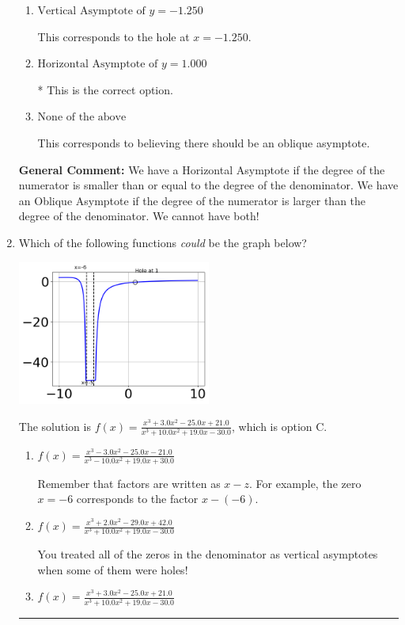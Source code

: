 \documentclass{extbook}[14pt]
\newcommand{\litem}[1]{\item #1

\rule{\textwidth}{0.4pt}}
\begin{document}
\begin{enumerate}
{\begin{enumerate}[label=\Alph*.]
This corresponds to using the rule for Horizontal Asymptote when the degree of the denominator is larger than the numerator.
\item \( \text{Vertical Asymptote of } y = -1.250  \)

This corresponds to the hole at $x = -1.250$.
\item \( \text{Horizontal Asymptote of } y = 1.000  \)

* This is the correct option.
\item \( \text{None of the above} \)

This corresponds to believing there should be an oblique asymptote.
\end{enumerate}

\textbf{General Comment:} We have a Horizontal Asymptote if the degree of the numerator is smaller than or equal to the degree of the denominator. We have an Oblique Asymptote if the degree of the numerator is larger than the degree of the denominator. We cannot have both!
}
\litem{
Which of the following functions \textit{could} be the graph below?

\begin{center}
    \includegraphics[width=0.5\textwidth]{../Figures/identifyGraphOfRationalFunctionB.png}
\end{center}


The solution is \( f(x)=\frac{x^{3} +3.0 x^{2} -25.0 x + 21.0}{x^{3} +10.0 x^{2} +19.0 x -30.0} \), which is option C.\begin{enumerate}[label=\Alph*.]
\item \( f(x)=\frac{x^{3} -3.0 x^{2} -25.0 x -21.0}{x^{3} -10.0 x^{2} +19.0 x + 30.0} \)

Remember that factors are written as $x-z$. For example, the zero $x=-6$ corresponds to the factor $x-(-6)$.
\item \( f(x)=\frac{x^{3} +2.0 x^{2} -29.0 x + 42.0}{x^{3} +10.0 x^{2} +19.0 x -30.0} \)

You treated all of the zeros in the denominator as vertical asymptotes when some of them were holes!
\item \( f(x)=\frac{x^{3} +3.0 x^{2} -25.0 x + 21.0}{x^{3} +10.0 x^{2} +19.0 x -30.0} \)


\end{enumerate}}
\end{enumerate}
\end{document}
